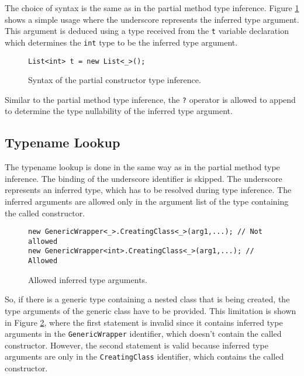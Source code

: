 The choice of syntax is the same as in the partial method type inference.
Figure \ref{img56:constructorTypeInferenceExample} shows a simple usage where the underscore represents the inferred type argument.
This argument is deduced using a type received from the \texttt{t} variable declaration which determines the \texttt{int} type to be the inferred type argument.
\begin{figure}[h!]
\begin{lstlisting}[style=csharp, mathescape=true]
List<int> t = new List<_>();
\end{lstlisting}
\caption{Syntax of the partial constructor type inference.}
\label{img56:constructorTypeInferenceExample}
\end{figure}
\par
Similar to the partial method type inference, the \texttt{?} operator is allowed to append to determine the type nullability of the inferred type argument.

\subsection{Typename Lookup}

The typename lookup is done in the same way as in the partial method type inference. 
The binding of the underscore identifier is skipped. 
The underscore represents an inferred type, which has to be resolved during type inference. 
The inferred arguments are allowed only in the argument list of the type containing the called constructor.
\begin{figure}[h!]
\begin{lstlisting}[style=csharp, mathescape=true]
new GenericWrapper<_>.CreatingClass<_>(arg1,...); // Not allowed
new GenericWrapper<int>.CreatingClass<_>(arg1,...); // Allowed
\end{lstlisting}
\caption{Allowed inferred type arguments.}
\label{img59:TypeArgList}
\end{figure}
So, if there is a generic type containing a nested class that is being created, the type arguments of the generic class have to be provided. 
This limitation is shown in Figure \ref{img59:TypeArgList}, where the first statement is invalid since it contains inferred type arguments in the \texttt{GenericWrapper} identifier, which doesn’t contain the called constructor. 
However, the second statement is valid because inferred type arguments are only in the \texttt{CreatingClass} identifier, which contains the called constructor.

